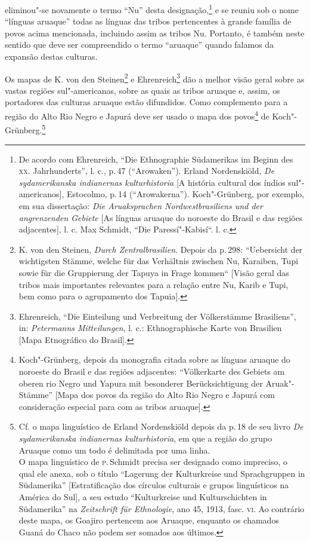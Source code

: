 eliminou"-se novamente o termo ``Nu'' desta designação,\footnote{De acordo
  com Ehrenreich, ``Die Ethnographie Südamerikas im Beginn des \textsc{xx}.
  Jahrhunderts'', l. c., p.\,47 (``Arowaken''). Erland Nordenskiöld,
  \textit{De sydamerikanska indianernas kulturhistoria} {[}A história
  cultural dos índios sul"-americanos{]}, Estocolmo, p.\,14
  (``Arowakerna''). Koch"-Grünberg, por exemplo, em sua dissertação:
  \textit{Die Aruaksprachen Nordwestbrasiliens und der angrenzenden
  Gebiete} {[}As línguas aruaque do noroeste do Brasil e das regiões
  adjacentes{]}, l. c. Max Schmidt, ``Die Paressí"-Kabisí``. l. c.} e se
reuniu sob o nome ``línguas aruaque'' todas as línguas das tribos
pertencentes à grande família de povos acima mencionada, incluindo assim
as tribos Nu. Portanto, é também neste sentido que deve ser compreendido o
termo ``aruaque'' quando falamos da expansão destas culturas.

Os mapas de K. von den Steinen\footnote{K. von den Steinen, \textit{Durch
  Zentralbrasilien}. Depois da p.\,298: ``Uebersicht der wichtigsten
  Stämme, welche für das Verhältnis zwischen Nu, Karaiben, Tupi sowie
  für die Gruppierung der Tapuya in Frage kommen`` {[}Visão geral das
  tribos mais importantes relevantes para a relação entre Nu, Karib e
  Tupi, bem como para o agrupamento dos Tapuia{]}.} e
Ehrenreich\footnote{Ehrenreich, ``Die Einteilung und Verbreitung der
  Völkerstämme Brasiliens'', in: \textit{Petermanns Mitteilungen}, l. c.:
  Ethnographische Karte von Brasilien {[}Mapa Etnográfico do Brasil{]}.}
dão a melhor visão geral sobre as vastas regiões sul"-americanas, sobre
as quais as tribos aruaque e, assim, os portadores das culturas aruaque
estão difundidos. Como complemento para a região do Alto Rio Negro e
Japurá deve ser usado o mapa dos povos\footnote{Koch"-Grünberg, depois da
  monografia citada sobre as línguas aruaque do noroeste do Brasil e das
  regiões adjacentes: ``Völkerkarte des Gebiets am oberen rio Negro und
  Yapura mit besonderer Berücksichtigung der Aruak"-Stämme'' {[}Mapa dos
  povos da região do Alto Rio Negro e Japurá com consideração especial
  para com as tribos aruaque{]}.} de Koch"-Grünberg.\footnote{Cf. o mapa
  linguístico de Erland Nordenskiöld depois da p.\,18 de seu livro
  \textit{De sydamerikanska indianernas kulturhistoria}, em que a região
  do grupo Aruaque como um todo é delimitada por uma linha.\\
  O mapa linguístico de \textsc{p}.\,Schmidt precisa ser designado como impreciso,
  o qual ele anexa, sob o título ``Lagerung der Kulturkreise und
  Sprachgruppen in Südamerika'' {[}Estratificação dos círculos
  culturais e grupos linguísticos na América do Sul{]}, a seu estudo
  ``Kulturkreise und Kulturschichten in Südamerika'' na
  \textit{Zeitschrift für Ethnologie}, ano 45, 1913, fasc. \textsc{vi}. Ao
  contrário deste mapa, os Goajiro pertencem aos Aruaque, enquanto os
  chamados Guaná do Chaco não podem ser somados aos últimos.}

